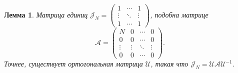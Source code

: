 \documentclass[14pt,a4paper]{extarticle}
\numberwithin{equation}{section}
\newtheorem{lem}{Лемма}
\theoremstyle{definition}
\begin{document}
\begin{lem}
    Матрица единиц 
    \( \mathcal{J}_N =
    \begin{pmatrix}
        1 & \cdots & 1 \\
        \vdots & \ddots & \vdots \\ 
    1 & \cdots & 1 \end{pmatrix} \),
    подобна матрице
    \[
        \mathcal{A} = \begin{pmatrix}
            N & 0 & \cdots & 0 \\
            0 & 0 & \cdots & 0 \\
            \vdots & \vdots & \ddots & \vdots \\
            0 & 0 & \cdots & 0 \end{pmatrix}. \]
    Точнее, существует ортогональная матрица \( \mathcal{U} \),
    такая что
    \( \mathcal{J}_N = \mathcal{U}\mathcal{A} \mathcal{U}^{-1} \).
\end{lem}
\end{document}
